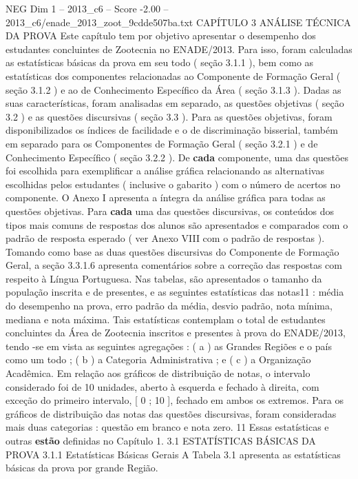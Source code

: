 \begin{textsample}{NEG Dim 1 – 2013\_c6 – Score -2.00 – 2013\_c6/enade\_2013\_zoot\_9cdde507ba.txt}  \label{ex:f1_neg_264}
CAPÍTULO 3 ANÁLISE TÉCNICA DA PROVA Este capítulo tem por objetivo apresentar o desempenho dos estudantes concluintes de Zootecnia no ENADE/2013.
Para isso, foram calculadas as estatísticas básicas da prova em seu todo ( seção 3.1.1 ), bem como as estatísticas dos componentes relacionadas ao Componente de Formação Geral ( seção 3.1.2 ) e ao de Conhecimento Específico da Área ( seção 3.1.3 ).
Dadas as suas características, foram analisadas em separado, as questões objetivas ( seção 3.2 ) e as questões discursivas ( seção 3.3 ).
Para as questões objetivas, foram disponibilizados os índices de facilidade e o de discriminação bisserial, também em separado para os Componentes de Formação Geral ( seção 3.2.1 ) e de Conhecimento Específico ( seção 3.2.2 ).
De \textbf{cada} componente, uma das questões foi escolhida para exemplificar a análise gráfica relacionando as alternativas escolhidas pelos estudantes ( inclusive o gabarito ) com o número de acertos no componente.
O Anexo I apresenta a íntegra da análise gráfica para todas as questões objetivas.
Para \textbf{cada} uma das questões discursivas, os conteúdos dos tipos mais comuns de respostas dos alunos são apresentados e comparados com o padrão de resposta esperado ( ver Anexo VIII com o padrão de respostas ).
Tomando como base as duas questões discursivas do Componente de Formação Geral, a seção 3.3.1.6 apresenta comentários sobre a correção das respostas com respeito à Língua Portuguesa.
Nas tabelas, são apresentados o tamanho da população inscrita e de presentes, e as seguintes estatísticas das notas11 : média do desempenho na prova, erro padrão da média, desvio padrão, nota mínima, mediana e nota máxima.
Tais estatísticas contemplam o total de estudantes concluintes da Área de Zootecnia inscritos e presentes à prova do ENADE/2013, tendo -se em vista as seguintes agregações : ( a ) as Grandes Regiões e o país como um todo ; ( b ) a Categoria Administrativa ; e ( c ) a Organização Acadêmica.
Em relação aos gráficos de distribuição de notas, o intervalo considerado foi de 10 unidades, aberto à esquerda e fechado à direita, com exceção do primeiro intervalo, [ 0 ; 10 ], fechado em ambos os extremos.
Para os gráficos de distribuição das notas das questões discursivas, foram consideradas mais duas categorias : questão em branco e nota zero. 11 Essas estatísticas e outras \textbf{estão} definidas no Capítulo 1. 3.1 ESTATÍSTICAS BÁSICAS DA PROVA 3.1.1 Estatísticas Básicas Gerais A Tabela 3.1 apresenta as estatísticas básicas da prova por grande Região.

\end{textsample}
